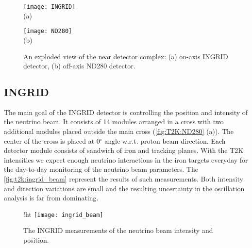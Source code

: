 \documentclass[../main.tex]{subfiles}
\begin{document}
\begin{figure}[!ht]
  \centering
  \begin{minipage}{0.49\linewidth}
    \centering
    \texttt{[image: INGRID]} \\ (a)
  \end{minipage}
  \begin{minipage}{0.49\linewidth}
    \centering
    \texttt{[image: ND280]} \\ (b)
  \end{minipage}
    \caption{An exploded view of the near detector complex: (a) on-axis INGRID detector, (b) off-axis ND280 detector.}
    \label{fig:T2K:ND280}
\end{figure}

\subsection {INGRID}
The main goal of the INGRID detector is controlling the position and intensity of the neutrino beam. It consists of 14 modules arranged in a cross with two additional modules placed outside the main cross (\autoref{fig:T2K:ND280} (a)). The center of the cross is placed at 0$^\circ$ angle w.r.t. proton beam direction. Each detector module consists of sandwich of iron and tracking planes. With the T2K intensities we expect enough neutrino interactions in the iron targets everyday for the day-to-day monitoring of the neutrino beam parameters. The \autoref{fig:t2k:ingrid_beam} represent the results of such measurements. Both intensity and direction variations are small and the resulting uncertainty in the oscillation analysis is far from dominating.

\begin{figure}{!ht}
  \centering
  \texttt{[image: ingrid\_beam]}
  \caption{The INGRID measurements of the neutrino beam intensity and position.}
  \label{fig:t2k:ingrid_beam}
\end{figure}
\end{document}
